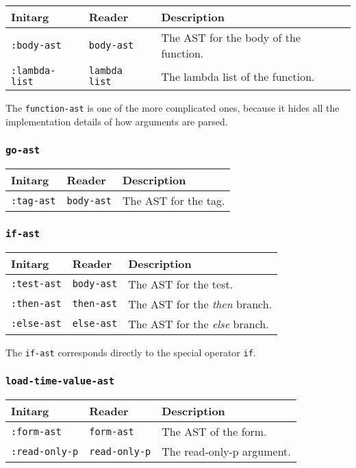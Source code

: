 \begin{tabular}{|l|l|l|}
\hline
Initarg & Reader & Description\\
\hline\hline
\texttt{:body-ast} & \texttt{body-ast} & The AST for the body of the function.\\
\hline
\texttt{:lambda-list} & \texttt{lambda list} & The lambda list of the function.\\
\hline
\end{tabular}

The \texttt{function-ast} is one of the more complicated ones, because
it hides all the implementation details of how arguments are parsed.

\subsubsection{\texttt{go-ast}}
\label{go-ast}

\begin{tabular}{|l|l|l|}
\hline
Initarg & Reader & Description\\
\hline\hline
\texttt{:tag-ast} & \texttt{body-ast} & The AST for the tag.\\
\hline
\end{tabular}

\subsubsection{\texttt{if-ast}}
\label{if-ast}

\begin{tabular}{|l|l|l|}
\hline
Initarg & Reader & Description\\
\hline\hline
\texttt{:test-ast} & \texttt{body-ast} & The AST for the test.\\
\hline
\texttt{:then-ast} & \texttt{then-ast} & The AST for the \emph{then} branch.\\
\hline
\texttt{:else-ast} & \texttt{else-ast} & The AST for the \emph{else} branch.\\
\hline
\end{tabular}

The \texttt{if-ast} corresponds directly to the \commonlisp{} special operator
\texttt{if}.

\subsubsection{\texttt{load-time-value-ast}}
\label{load-time-value-ast}

\begin{tabular}{|l|l|l|}
\hline
Initarg & Reader & Description\\
\hline\hline
\texttt{:form-ast} & \texttt{form-ast} & The AST of the form.\\
\texttt{:read-only-p} & \texttt{read-only-p} & The read-only-p argument.\\
\hline
\end{tabular}

